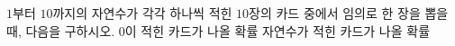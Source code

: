 $1$부터 $10$까지의 자연수가 각각 하나씩 적힌 $10$장의 카드 중에서 임의로 한 장을 뽑을 때, 다음을 구하시오.
 $0$이 적힌 카드가 나올 확률
 자연수가 적힌 카드가 나올 확률
